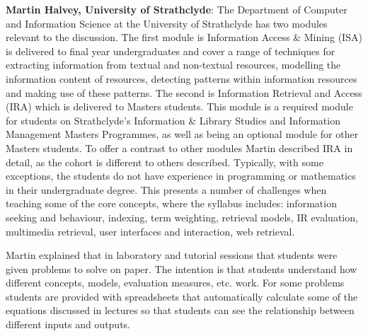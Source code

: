 {\bf Martin Halvey, University of Strathclyde}: The Department of Computer and Information Science at the University of Strathclyde has two modules relevant to the discussion. The first module is Information Access \& Mining (ISA) is delivered to final year undergraduates and cover a range of techniques for extracting information from textual and non-textual resources, modelling the information content of resources, detecting patterns within information resources and making use of these patterns. The second is Information Retrieval and Access (IRA) which is delivered to Masters students. This module is a required module for students on Strathclyde's Information \& Library Studies and Information Management Masters Programmes, as well as being an optional module for other Masters students. To offer a contrast to other modules Martin described IRA in detail, as the cohort is different to others described. Typically, with some exceptions, the students do not have experience in programming or mathematics in their undergraduate degree. This presents a number of challenges when teaching some of the core concepts, where the syllabus includes:
information seeking and behaviour,
indexing,
term weighting,
retrieval models,
IR evaluation,
multimedia retrieval,
user interfaces and interaction,
web retrieval. 

Martin explained that in laboratory and tutorial sessions that students were given problems to solve on paper. The intention is that students understand how different concepts, models, evaluation measures, etc. work. For some problems students are provided with spreadsheets that automatically calculate some of the equations discussed in lectures so that students can see the relationship between different inputs and outputs. 

